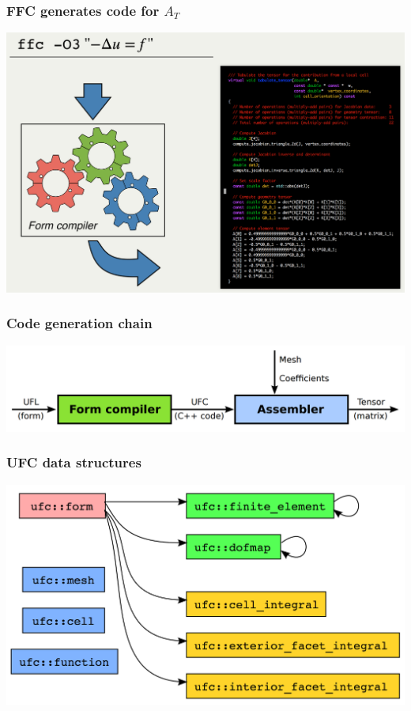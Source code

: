 \documentclass{fenicscourse}
\begin{document}
\begin{frame}
  \frametitle{FFC generates code for $A_T$}
  \includegraphics[width=\textwidth]{png/codegeneration_new.png}
\end{frame}

\begin{frame}
  \frametitle{Code generation chain}
  \includegraphics[width=\textwidth]{png/assembly_chain.png}
\end{frame}

\begin{frame}
  \frametitle{UFC data structures}
  \includegraphics[width=\textwidth]{png/ufc_data_structures.png}
\end{frame}
\end{document}
